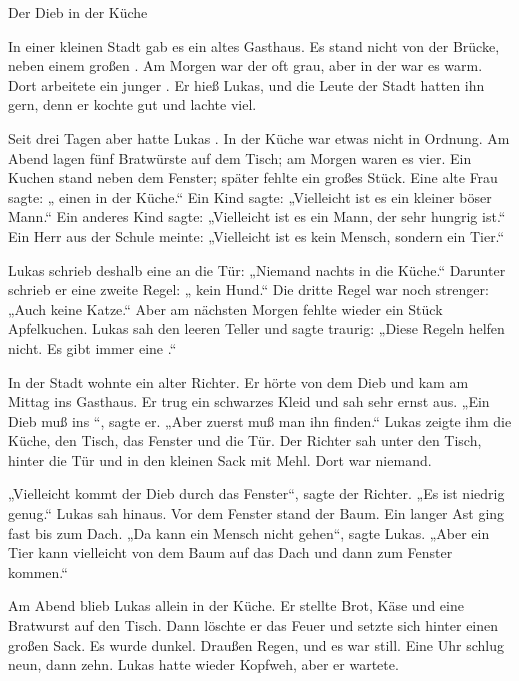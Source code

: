 \documentclass[12pt]{nextbook}
\begin{document}
\begin{readersection}{Der Dieb in der Küche}

In einer kleinen Stadt gab es ein altes Gasthaus. Es stand nicht  von der Brücke, neben einem großen . Am Morgen war der  oft grau, aber in der  war es warm. Dort arbeitete ein junger . Er hieß Lukas, und die Leute der Stadt hatten ihn gern, denn er kochte gut und lachte viel.

Seit drei Tagen aber hatte Lukas . In der Küche war etwas nicht in Ordnung. Am Abend lagen fünf Bratwürste auf dem Tisch; am Morgen waren es  vier. Ein Kuchen stand neben dem Fenster; später fehlte ein großes Stück. Eine alte Frau sagte: „ einen  in der Küche.“ Ein Kind sagte: „Vielleicht ist es ein kleiner böser Mann.“ Ein anderes Kind sagte: „Vielleicht ist es ein  Mann, der sehr hungrig ist.“ Ein  Herr aus der Schule meinte: „Vielleicht ist es kein Mensch, sondern ein Tier.“

Lukas schrieb deshalb eine  an die Tür: „Niemand  nachts in die Küche.“ Darunter schrieb er eine zweite Regel: „ kein Hund.“ Die dritte Regel war noch strenger: „Auch keine Katze.“ Aber am nächsten Morgen fehlte wieder ein Stück Apfelkuchen. Lukas sah den leeren Teller und sagte traurig: „Diese Regeln helfen nicht. Es gibt immer eine .“

In der Stadt wohnte ein alter Richter. Er hörte von dem Dieb und kam am Mittag ins Gasthaus. Er trug ein schwarzes Kleid und sah sehr ernst aus. „Ein Dieb muß ins “, sagte er. „Aber zuerst muß man ihn finden.“ Lukas zeigte ihm die Küche, den Tisch, das Fenster und die Tür. Der Richter sah unter den Tisch, hinter die Tür und in den kleinen Sack mit Mehl. Dort war niemand.

„Vielleicht kommt der Dieb durch das Fenster“, sagte der Richter. „Es ist niedrig genug.“ Lukas sah hinaus. Vor dem Fenster stand der Baum. Ein langer Ast ging fast bis zum Dach. „Da kann ein Mensch nicht gehen“, sagte Lukas. „Aber ein Tier kann vielleicht von dem Baum auf das Dach und dann zum Fenster kommen.“

Am Abend blieb Lukas allein in der Küche. Er stellte Brot, Käse und eine Bratwurst auf den Tisch. Dann löschte er das Feuer und setzte sich hinter einen großen Sack. Es wurde dunkel. Draußen  Regen, und es war still. Eine Uhr schlug neun, dann zehn. Lukas hatte wieder Kopfweh, aber er wartete.


\end{readersection}
\end{document}
